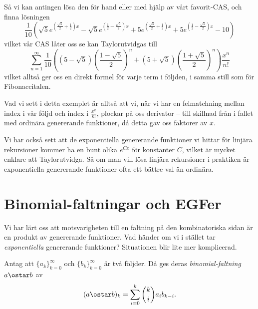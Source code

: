 \documentclass[nobib]{tufte-handout}
\begin{document}
\begin{example}
  Så vi kan antingen lösa den för hand eller med hjälp av vårt favorit-CAS, och finna lösningen
  $$\frac{1}{10} \left(\sqrt{5} e^{\left(\frac{\sqrt{5}}{2}+\frac{1}{2}\right) x}-\sqrt{5} e^{\left(\frac{1}{2}-\frac{\sqrt{5}}{2}\right) x}+5 e^{\left(\frac{\sqrt{5}}{2}+\frac{1}{2}\right) x}+5 e^{\left(\frac{1}{2}-\frac{\sqrt{5}}{2}\right) x}-10\right)$$
  vilket vår CAS låter oss se kan Taylorutvidgas till
  $$\sum_{n=1}^{\infty} \frac{1}{10}\left(\left(5 - \sqrt{5}\right) \left(\frac{1 - \sqrt{5}}{2}\right)^n + \left(5 + \sqrt{5}\right) \left(\frac{1 + \sqrt{5}}{2}\right)^n\right)\frac{x^n}{n!}$$
  vilket alltså ger oss en direkt formel för varje term i följden, i samma still som för Fibonaccitalen.
\end{example}

Vad vi sett i detta exemplet är alltså att vi, när vi har en felmatchning mellan index i vår följd och index i $\frac{x^k}{k!}$, plockar på oss derivator -- till skillnad från i fallet med ordinära genererande funktioner, då detta gav oss faktorer av $x$.

Vi har också sett att de exponentiella genererande funktioner vi hittar för linjära rekursioner kommer ha en bunt olika $e^{Cx}$ för konstanter $C$, vilket är mycket enklare att Taylorutvidga. Så om man vill lösa linjära rekursioner i praktiken är exponentiella genererande funktioner ofta ett bättre val än ordinära.

\section{Binomial-faltningar och EGFer}

Vi har lärt oss att motsvarigheten till en faltning på den kombinatoriska sidan är en produkt av genererande funktioner. Vad händer om vi i stället tar \emph{exponentiella} genererande funktioner? Situationen blir lite mer komplicerad.

\begin{definition}
  Antag att $\{a_k\}_{k=0}^\infty$ och $\{b_k\}_{k=0}^\infty$ är två följder. Då ges deras \emph{binomial-faltning} $a \ostar b$ av
  $$(a \ostar b)_k = \sum_{i=0}^{k} \binom{k}{i} a_i b_{k-i}.$$
\end{definition}
\end{document}
